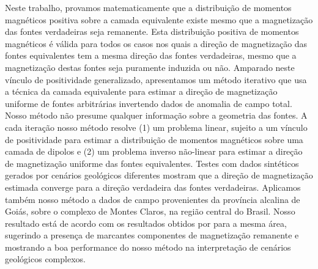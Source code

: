 Neste trabalho, provamos matematicamente que a distribuição de momentos magnéticos positiva sobre a camada equivalente existe mesmo que a magnetização das fontes verdadeiras seja remanente. Esta distribuição positiva de momentos magnéticos é válida para todos os casos nos quais a direção de magnetização das fontes equivalentes tem a mesma direção das fontes verdadeiras, mesmo que a magnetização destas fontes seja puramente induzida ou não. Amparado neste vínculo de positividade generalizado, apresentamos um método iterativo que usa a técnica da camada equivalente para estimar a direção de magnetização uniforme de fontes arbitrárias invertendo dados de anomalia de campo total. Nosso método não presume qualquer informação sobre a geometria das fontes. A cada iteração nosso método resolve (1) um problema linear, sujeito a um vínculo de positividade para estimar a distribuição de momentos magnéticos sobre uma camada de dipolos e (2) um problema inverso não-linear para estimar a direção de magnetização uniforme das fontes equivalentes. Testes com dados sintéticos gerados por cenários geológicos diferentes mostram que a direção de magnetização estimada converge para a direção verdadeira das fontes verdadeiras. Aplicamos também nosso método a dados de campo provenientes da província alcalina de Goiás, sobre o complexo de Montes Claros, na região central do Brasil. Nosso resultado está de acordo com os resultados obtidos por \cite{zhang_etal_2018} para a mesma área, sugerindo a presença de marcantes componentes de magnetização remanente e mostrando a boa performance do nosso método na interpretação de cenários geológicos complexos. 


